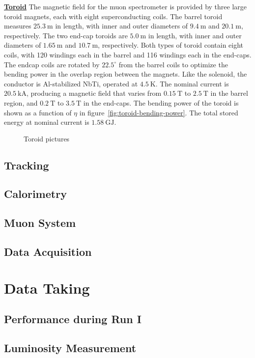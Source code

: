 \underline{\textbf{Toroid}}
The magnetic field for the muon spectrometer is provided by three large toroid magnets, each with eight superconducting coils. The barrel toroid measures $25.3~\mbox{m}$ in length, with inner and outer diameters of $9.4~\mbox{m}$ and $20.1~\mbox{m}$, respectively. The two end-cap toroids are $5.0~\mbox{m}$ in length, with inner and outer diameters of $1.65~\mbox{m}$ and $10.7~\mbox{m}$, respectively. Both types of toroid contain eight coils, with 120 windings each in the barrel and 116 windings each in the end-caps. The endcap coils are rotated by $22.5^{\circ}$ from the barrel coils to optimize the bending power in the overlap region between the magnets. Like the solenoid, the conductor is Al-stabilized NbTi, operated at $4.5~\mbox{K}$. The nominal current is $20.5~\mbox{kA}$, producing a magnetic field that varies from $0.15~\mbox{T}$ to $2.5~\mbox{T}$ in the barrel region, and $0.2~\mbox{T}$ to $3.5~\mbox{T}$ in the end-caps. The bending power of the toroid is shown as a function of $\eta$ in figure~\ref{fig:toroid-bending-power}. The total stored energy at nominal current is $1.58~\mbox{GJ}$. 


\begin{figure}[htbp]
	Toroid pictures
\end{figure}


\subsection{Tracking}

\subsection{Calorimetry}

\subsection{Muon System}

\subsection{Data Acquisition}




\section{Data Taking}
\subsection{Performance during Run I}

\subsection{Luminosity Measurement}


\printbibliography